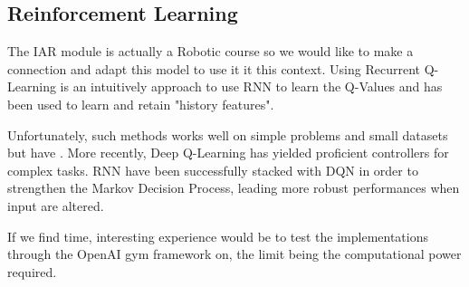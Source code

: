 \documentclass[a4paper,10pt]{article}
\begin{document}
\subsection{Reinforcement Learning}

The IAR module is actually a Robotic course so we would like to make a connection and adapt this model to use it it this context.
Using Recurrent Q-Learning \cite{} is an intuitively approach to use RNN to learn the Q-Values and has been used to learn and retain "history features". 

Unfortunately, such methods works well on simple problems and small datasets but have . More recently, Deep Q-Learning \cite{} has yielded proficient controllers for complex tasks. RNN have been successfully stacked with DQN in order to strengthen the Markov Decision Process, leading more robust performances when input are altered. \newline

If we find time, interesting experience would be to test the implementations through the OpenAI gym framework \cite{gym} on, the limit being the computational power required.
\end{document}
